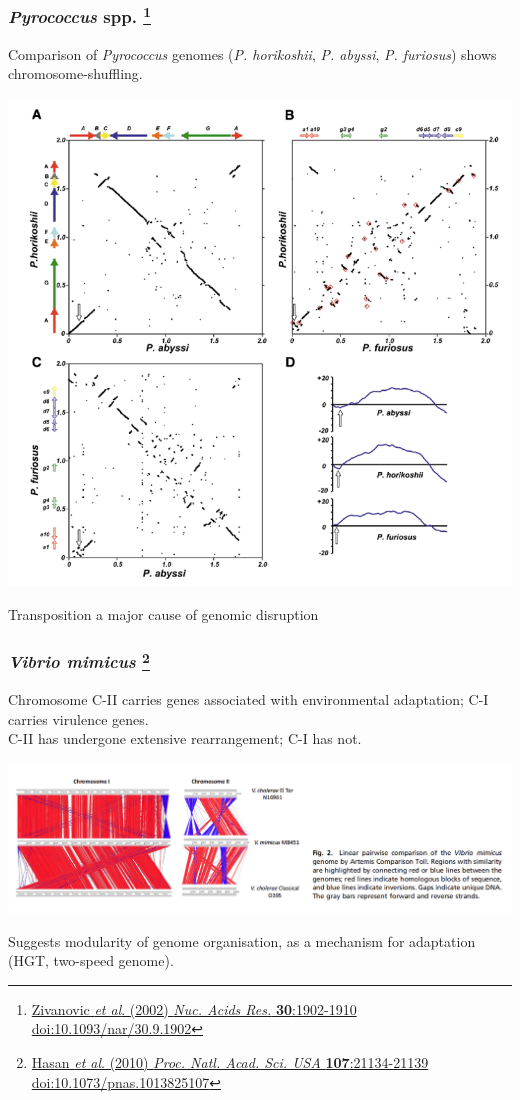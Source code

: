 \begin{frame}
  \frametitle{\textit{Pyrococcus} spp.
  \footnote{\tiny{\href{http://dx.doi.org/10.1093/nar/30.9.1902}{Zivanovic \textit{et al}. (2002) \textit{Nuc. Acids Res.} \textbf{30}:1902-1910 doi:10.1093/nar/30.9.1902}}}
  }
  Comparison of \textit{Pyrococcus} genomes (\textit{P. horikoshii}, \textit{P. abyssi}, \textit{P. furiosus}) shows chromosome-shuffling.\\
  \begin{center}
    \includegraphics[height=0.5\textheight]{images/pyrococcus}
  \end{center}    
  Transposition a major cause of genomic disruption    
\end{frame}


\begin{frame}
  \frametitle{\textit{Vibrio mimicus} 
  \footnote{\tiny{\href{http://dx.doi.org/10.1073/pnas.1013825107}{Hasan \textit{et al}. (2010) \textit{Proc. Natl. Acad. Sci. USA} \textbf{107}:21134-21139 doi:10.1073/pnas.1013825107}}}
  }
  Chromosome C-II carries genes associated with environmental adaptation; C-I carries virulence genes.\\
  C-II has undergone extensive rearrangement; C-I has not.\\
  \begin{center}
    \includegraphics[width=1\textwidth]{images/v_mimicus}
  \end{center}    
  Suggests modularity of genome organisation, as a mechanism for adaptation (HGT, two-speed genome).
\end{frame}

